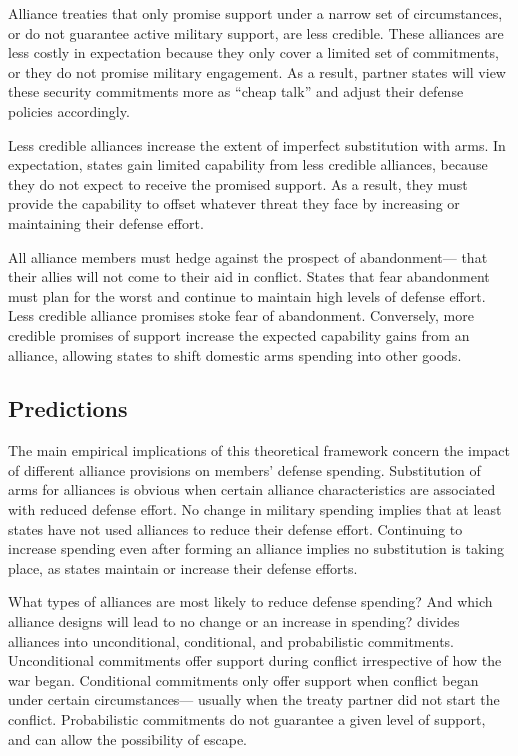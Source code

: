 \documentclass[12pt]{article}
\begin{document}
Alliance treaties that only promise support under a narrow set of circumstances, or do not guarantee active military support, are less credible. These alliances are less costly in expectation because they only cover a limited set of commitments, or they do not promise military engagement. As a result, partner states will view these security commitments more as ``cheap talk'' and adjust their defense policies accordingly. 

Less credible alliances increase the extent of imperfect substitution with arms. In expectation, states gain limited capability from less credible alliances, because they do not expect to receive the promised support. As a result, they must provide the capability to offset whatever threat they face by increasing or maintaining their defense effort.

All alliance members must hedge against the prospect of abandonment--- that their allies will not come to their aid in conflict. States that fear abandonment must plan for the worst and continue to maintain high levels of defense effort. Less credible alliance promises stoke fear of abandonment. Conversely, more credible promises of support increase the expected capability gains from an alliance, allowing states to shift domestic arms spending into other goods. 


\subsection*{Predictions}

The main empirical implications of this theoretical framework concern the impact of different alliance provisions on members' defense spending. Substitution of arms for alliances is obvious when certain alliance characteristics are associated with reduced defense effort. No change in military spending implies that at least states have not used alliances to reduce their defense effort. Continuing to increase spending even after forming an alliance implies no substitution is taking place, as states maintain or increase their defense efforts.

What types of alliances are most likely to reduce defense spending? And which alliance designs will lead to no change or an increase in spending? \citet{Benson2011, Benson2012} divides alliances into unconditional, conditional, and probabilistic commitments. Unconditional commitments offer support during conflict irrespective of how the war began. Conditional commitments only offer support when conflict began under certain circumstances--- usually when the treaty partner did not start the conflict. Probabilistic commitments do not guarantee a given level of support, and can allow the possibility of escape. 
\end{document}
